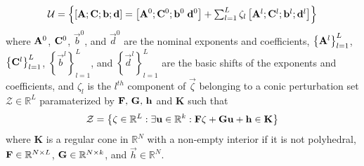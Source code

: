 \begin{equation}
\mathcal{U} = \left\{\left[\mathbf{A};\mathbf{C};\mathbf{b};\mathbf{d}\right] = \left[\mathbf{A}^0;\mathbf{C}^0;\mathbf{b}^0\;\mathbf{d}^0 \right] + \textstyle{\sum_{l=1}^{L}\zeta_l\left[\mathbf{A}^l;\mathbf{C}^l;\mathbf{b}^l; \mathbf{d}^l\right]}\right\}
\label{Data}
\end{equation}
where $\mathbf{A}^0$, $\mathbf{C}^0$, $\vec{b}^0$, and $\vec{d}^0$ are the nominal exponents and coefficients, $\left\{\mathbf{A}^l\right\}_{l=1}^{L}$, $\left\{\mathbf{C}^l\right\}_{l=1}^{L}$, $\left\{\vec{b}^l\right\}_{l=1}^{L}$, and $\left\{\vec{d}^l\right\}_{l=1}^{L}$ are the basic shifts of the exponents and coefficients, and $\zeta_l$ is the $l^{th}$ component of $\vec{\zeta}$ belonging to a conic perturbation set $\mathcal{Z} \in \mathbb{R}^L$ paramaterized by $\mathbf{F},\,\mathbf{G},\,\mathbf{h}$ and $\textbf{K}$ such that
\begin{equation}
\mathcal{Z} = \left\{ \mathbf{\zeta} \in \mathbb{R}^L: \exists \mathbf{u} \in \mathbb{R}^k:\mathbf{F}\mathbf{\zeta} + \mathbf{G}\mathbf{u} + \mathbf{h} \in \textbf{K} \right\}
\label{perturbation_set}
\end{equation}
where $\mathbf{K}$ is a regular cone in $\mathbb{R}^N$ with a non-empty interior if it is not polyhedral, $\mathbf{F} \in \mathbb{R}^{N \times L}$, $\mathbf{G} \in \mathbb{R}^{N \times k}$, and $\vec{h} \in \mathbb{R}^{N}$. 

